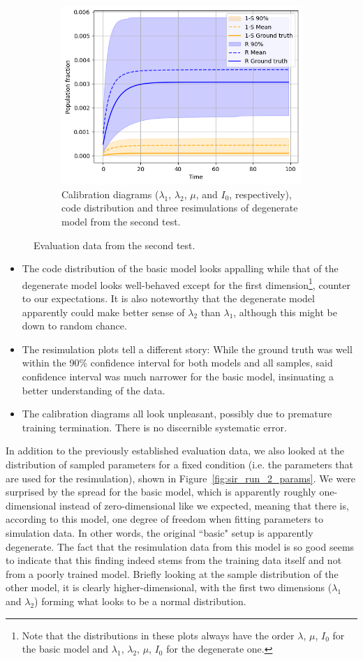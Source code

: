 \begin{figure}[ht]
\begin{subfigure}{\textwidth}
    \includegraphics[width=.25\textwidth]{images/sbi_sir/run_2/degen resim 3.png}
    \caption{Calibration diagrams ($\lambda_1$, $\lambda_2$, $\mu$, and $I_0$, respectively), code distribution and three resimulations of degenerate model from the second test.}
\end{subfigure}
\caption{Evaluation data from the second test. }
\label{fig:sir_run_2}
\end{figure}

\begin{itemize}
    \item The code distribution of the basic model looks appalling while that of the degenerate model looks well-behaved except for the first dimension\footnote{Note that the distributions in these plots always have the order $\lambda$, $\mu$, $I_0$ for the basic model and $\lambda_1$, $\lambda_2$, $\mu$, $I_0$ for the degenerate one.}, counter to our expectations. It is also noteworthy that the degenerate model apparently could make better sense of $\lambda_2$ than $\lambda_1$, although this might be down to random chance.
    
    \item The resimulation plots tell a different story: While the ground truth was well within the 90\% confidence interval for both models and all samples, said confidence interval was much narrower for the basic model, insinuating a better understanding of the data.
    
    \item The calibration diagrams all look unpleasant, possibly due to premature training termination. There is no discernible systematic error.
\end{itemize}

In addition to the previously established evaluation data, we also looked at the distribution of sampled parameters for a fixed condition (i.e. the parameters that are used for the resimulation), shown in Figure~\ref{fig:sir_run_2_params}. We were surprised by the spread for the basic model, which is apparently roughly one-dimensional instead of zero-dimensional like we expected, meaning that there is, according to this model, one degree of freedom when fitting parameters to simulation data. In other words, the original ``basic" setup is apparently degenerate. The fact that the resimulation data from this model is so good seems to indicate that this finding indeed stems from the training data itself and not from a poorly trained model. Briefly looking at the sample distribution of the other model, it is clearly higher-dimensional, with the first two dimensions ($\lambda_1$ and $\lambda_2$) forming what looks to be a normal distribution.

